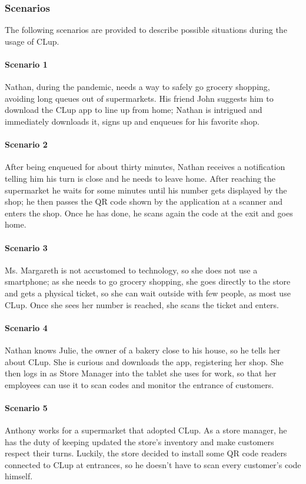 
\subsubsection{Scenarios}
The following scenarios are provided to describe possible situations during the usage of CLup.

\paragraph{Scenario 1}
Nathan, during the pandemic, needs a way to safely go grocery shopping, avoiding long queues out of supermarkets. His friend John suggests him to download the CLup app to line up from home; Nathan is intrigued and immediately downloads it, signs up and enqueues for his favorite shop.

\paragraph{Scenario 2}
After being enqueued for about thirty minutes, Nathan receives a notification telling him his turn is close and he needs to leave home. After reaching the supermarket he waits for some minutes until his number gets displayed by the shop; he then passes the QR code shown by the application at a scanner and enters the shop. Once he has done, he scans again the code at the exit and goes home. 

\paragraph{Scenario 3}
Ms. Margareth is not accustomed to technology, so she does not use a smartphone; as she needs to go grocery shopping, she goes directly to the store and gets a physical ticket, so she can wait outside with few people, as most use CLup. Once she sees her number is reached, she scans the ticket and enters.

\paragraph{Scenario 4}
Nathan knows Julie, the owner of a bakery close to his house, so he tells her about CLup. She is curious and downloads the app, registering her shop. She then logs in as Store Manager into the tablet she uses for work, so that her employees can use it to scan codes and monitor the entrance of customers.

\paragraph{Scenario 5}
Anthony works for a supermarket that adopted CLup. As a store manager, he has the duty of keeping updated the store’s inventory and make customers respect their turns. Luckily, the store decided to install some QR code readers connected to CLup at entrances, so he doesn’t have to scan every customer’s code himself. 

